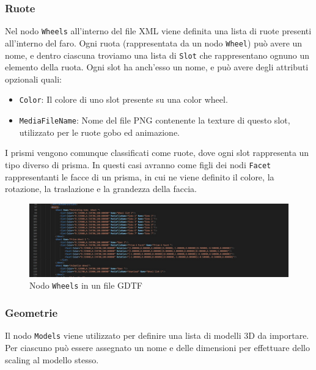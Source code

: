 \documentclass[main.tex]{subfiles}
\begin{document}
\subsubsection{Ruote}\label{subsec:1_2_wheels}
Nel nodo \lstinline{Wheels} all'interno del file XML viene definita una lista di ruote presenti all'interno del faro. Ogni ruota (rappresentata da un nodo \lstinline{Wheel}) può avere un nome, e dentro ciascuna troviamo una lista di \lstinline{Slot} che rappresentano ognuno un elemento della ruota. Ogni slot ha anch'esso un nome, e può avere degli attributi opzionali quali:
\begin{itemize}
    \item \lstinline{Color}: Il colore di uno slot presente su una color wheel.
    \item \lstinline{MediaFileName}: Nome del file PNG contenente la texture di questo slot, utilizzato per le ruote gobo ed animazione.
\end{itemize}
I prismi vengono comunque classificati come ruote, dove ogni slot rappresenta un tipo diverso di prisma. In questi casi avranno come figli dei nodi \lstinline{Facet} rappresentanti le facce di un prisma, in cui ne viene definito il colore, la rotazione, la traslazione e la grandezza della faccia.
\begin{figure}[H]
    \centering
    \includegraphics[width=1\linewidth]{img/introduzione/GDTFwheelExample.jpg}
    \caption{Nodo \lstinline{Wheels} in un file GDTF}
    \label{fig:1_gdtfWheelExample}
\end{figure}

\subsubsection{Geometrie}\label{subsec:1_2_geometries}
Il nodo \lstinline{Models} viene utilizzato per definire una lista di modelli 3D da importare. Per ciascuno può essere assegnato un nome e delle dimensioni per effettuare dello scaling al modello stesso. 
\end{document}
